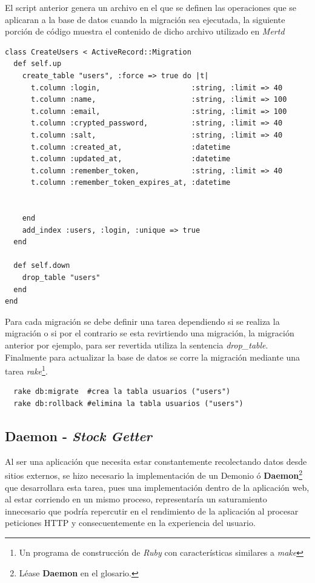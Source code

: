 El script anterior genera un archivo en el que se definen las operaciones que se aplicaran a la base de datos cuando la migración sea ejecutada, la siguiente porción de código muestra el contenido de dicho archivo utilizado en \emph{Mertd}

\begin{verbatim}
class CreateUsers < ActiveRecord::Migration
  def self.up
    create_table "users", :force => true do |t|
      t.column :login,                     :string, :limit => 40
      t.column :name,                      :string, :limit => 100
      t.column :email,                     :string, :limit => 100
      t.column :crypted_password,          :string, :limit => 40
      t.column :salt,                      :string, :limit => 40
      t.column :created_at,                :datetime
      t.column :updated_at,                :datetime
      t.column :remember_token,            :string, :limit => 40
      t.column :remember_token_expires_at, :datetime


    end
    add_index :users, :login, :unique => true
  end

  def self.down
    drop_table "users"
  end
end
\end{verbatim}

Para cada migración se debe definir una tarea dependiendo si se realiza la migración o si por el contrario se esta revirtiendo una migración\cite{vis:MiningMarketData}, la migración anterior por ejemplo, para ser revertida utiliza la sentencia \emph{drop\_table}.\\

Finalmente para actualizar la base de datos se corre la migración mediante una tarea \emph{rake}\footnote{Un programa de construcción de \emph{Ruby} con características similares a \emph{make}}.

\begin{verbatim}
  rake db:migrate  #crea la tabla usuarios ("users")
  rake db:rollback #elimina la tabla usuarios ("users")
\end{verbatim}

\subsection{Daemon - \emph{Stock Getter}}

Al ser una aplicación que necesita estar constantemente recolectando datos desde sitios externos, se hizo necesario la implementación de un Demonio ó \textbf{Daemon}\footnote{Léase \textbf{Daemon} en el glosario.} que desarrollara esta tarea, pues una implementación dentro de la aplicación web, al estar corriendo en un mismo proceso, representaría un saturamiento innecesario que podría repercutir en el rendimiento de la aplicación al procesar peticiones HTTP y consecuentemente en la experiencia del usuario.\\


